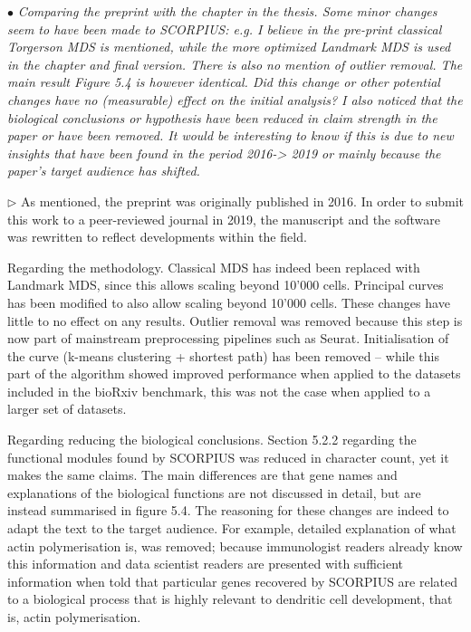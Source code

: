\documentclass[10pt]{article}
\newcommand{\exam}[2][\  ]{\hspace{0pt}\marginpar{\color{red}#1}$\bullet$ \textit{#2}}
\newcommand{\imp}[1]{{\color{red} #1}}
\newcommand{\answ}[1]{{\color{blue} $\triangleright$ #1}}
\newcommand{\bigexclaim}{\raisebox{-0.1em}{\BigTriangleUp}\hspace{-0.32em}\llap{\small\textbf{!}}\hspace{0.32em}}
\newcommand{\tagimp}{\bigexclaim}
\begin{document}
{\exam[\tagimp]{Comparing the preprint with the chapter in the thesis. Some minor changes
	seem to have been made to SCORPIUS: e.g. I believe in the pre-print
	classical Torgerson MDS is mentioned, while the more optimized Landmark
	MDS is used in the chapter and final version. There is also no mention of
	outlier removal. The main result Figure 5.4 is however identical. \imp{Did this
	change or other potential changes have no (measurable) effect on the initial
	analysis? I also noticed that the biological conclusions or hypothesis have
	been reduced in claim strength in the paper or have been removed.} It would
	be interesting to know if this is due to new insights that have been found in the
	period 2016-> 2019 or mainly because the paper’s target audience has
	shifted.} \\

\answ{As mentioned, the preprint was originally published in 2016. In order to submit this work to a peer-reviewed journal in 2019, the manuscript and the software was rewritten to reflect developments within the field.

Regarding the methodology. Classical MDS has indeed been replaced with Landmark MDS, since this allows scaling beyond 10'000 cells. Principal curves has been modified to also allow scaling beyond 10'000 cells. These changes have little to no effect on any results. Outlier removal was removed because this step is now part of mainstream preprocessing pipelines such as Seurat. Initialisation of the curve (k-means clustering + shortest path) has been removed -- while this part of the algorithm showed improved performance when applied to the datasets included in the bioRxiv benchmark, this was not the case when applied to a larger set of datasets. 

Regarding reducing the biological conclusions. Section 5.2.2 regarding the functional modules found by SCORPIUS was reduced in character count, yet it makes the same claims. The main differences are that gene names and explanations of the biological functions are not discussed in detail, but are instead summarised in figure 5.4. The reasoning for these changes are indeed to adapt the text to the target audience.
For example, detailed explanation of what actin polymerisation is, was removed; because immunologist readers already know this information and data scientist readers are presented with sufficient information when told that particular genes recovered by SCORPIUS are related to a biological process that is highly relevant to dendritic cell development, that is, actin polymerisation.}



}
\end{document}
